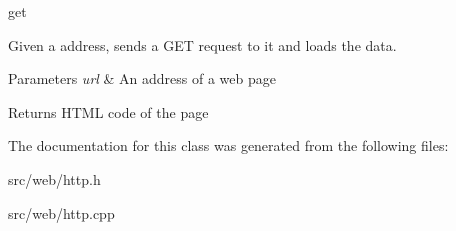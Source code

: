 get 

Given a address, sends a G\+ET request to it and loads the data.


\begin{DoxyParams}{Parameters}
{\em url} & An address of a web page \\
\hline
\end{DoxyParams}
\begin{DoxyReturn}{Returns}
H\+T\+ML code of the page 
\end{DoxyReturn}


The documentation for this class was generated from the following files\+:\begin{DoxyCompactItemize}
\item 
src/web/http.\+h\item 
src/web/http.\+cpp\end{DoxyCompactItemize}
